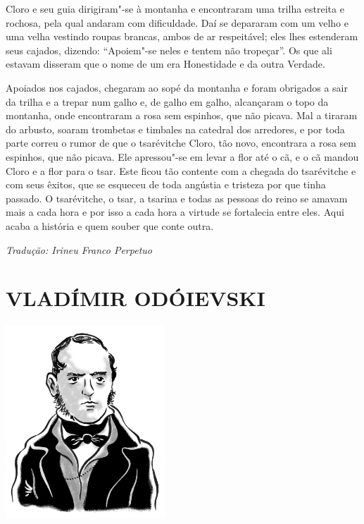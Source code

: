 Cloro e seu guia dirigiram"-se à montanha e encontraram uma trilha
estreita e rochosa, pela qual andaram com dificuldade. Daí se depararam
com um velho e uma velha vestindo roupas brancas, ambos de ar
respeitável; eles lhes estenderam seus cajados, dizendo: ``Apoiem"-se
neles e tentem não tropeçar''. Os que ali estavam disseram que o nome de
um era Honestidade e da outra Verdade.

Apoiados nos cajados, chegaram ao sopé da montanha e foram obrigados a
sair da trilha e a trepar num galho e, de galho em galho, alcançaram o
topo da montanha, onde encontraram a rosa sem espinhos, que não picava.
Mal a tiraram do arbusto, soaram trombetas e timbales na catedral dos
arredores, e por toda parte correu o rumor de que o tsarévitche Cloro,
tão novo, encontrara a rosa sem espinhos, que não picava. Ele apressou"-se
em levar a flor até o cã, e o cã mandou Cloro e a flor para o tsar. Este
ficou tão contente com a chegada do tsarévitche e com seus êxitos, que
se esqueceu de toda angústia e tristeza por que tinha passado. O
tsarévitche, o tsar, a tsarina e todas as pessoas do reino se amavam
mais a cada hora e por isso a cada hora a virtude se fortalecia entre eles. Aqui
acaba a história e quem souber que conte outra.

\medskip

{\footnotesize\hfill\emph{Tradução: Irineu Franco Perpetuo}}

\part[VLADÍMIR ODÓIEVSKI]{VLADÍMIR ODÓIEVSKI }

\pagebreak
\thispagestyle{empty}
\mbox{}
\vfill
\begin{center}
\includegraphics[width=6cm]{./imgs/autor2.jpg}
\end{center}


